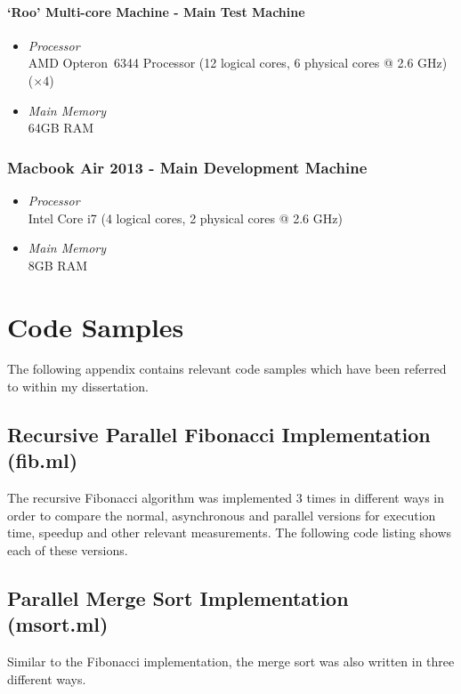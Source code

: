 \documentclass[12pt,twoside,notitlepage]{report}
\begin{document}
\subsubsection{`Roo' Multi-core Machine - Main Test Machine}
\begin{itemize}
\item {\em Processor} \hfill \\
AMD Opteron\texttrademark\ 6344 Processor (12 logical cores, 6 physical cores @ 2.6 GHz) ($\times4$)
\item {\em Main Memory} \hfill \\
64GB RAM
\end{itemize}

\subsection{Macbook Air 2013 - Main Development Machine}
\begin{itemize}
\item {\em Processor} \hfill \\
Intel Core i7 (4 logical cores, 2 physical cores @ 2.6 GHz)
\item {\em Main Memory} \hfill \\
8GB RAM
\end{itemize}

\chapter{Code Samples}
\label{chap:code_samples}
The following appendix contains relevant code samples which have been referred to within my dissertation.

\section{Recursive Parallel Fibonacci Implementation (fib.ml)}
The recursive Fibonacci algorithm was implemented 3 times in different ways in order to compare the normal, asynchronous and parallel versions for execution time, speedup and other relevant measurements. The following code listing
shows each of these versions.


\section{Parallel Merge Sort Implementation (msort.ml)}
Similar to the Fibonacci implementation, the merge sort was also written in three different ways.

\end{document}
